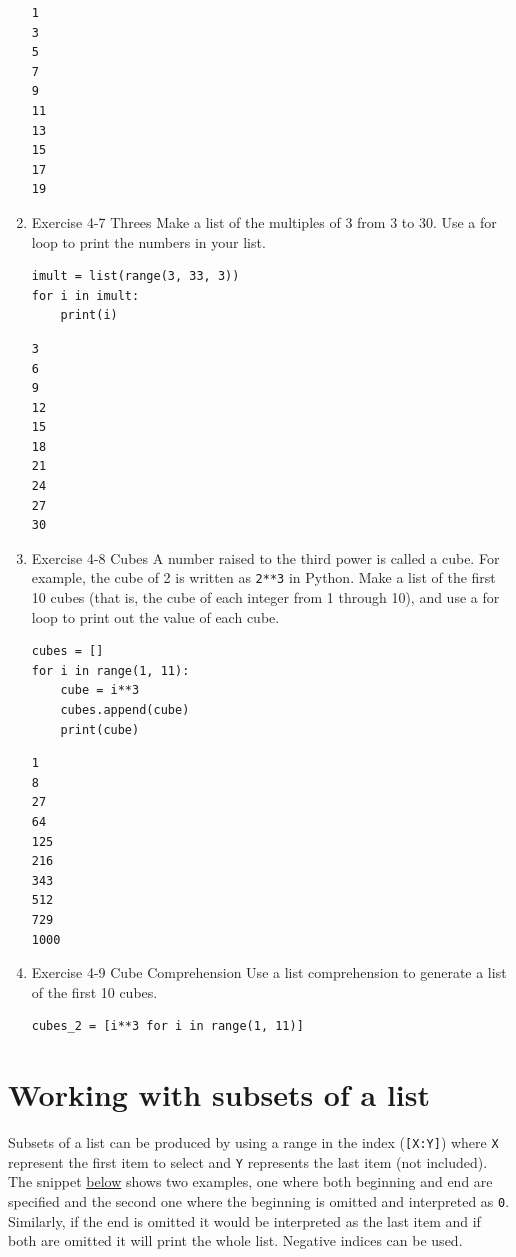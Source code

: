 \documentclass[10pt]{book}
\begin{document}
\begin{enumerate}
\label{org1cb2e98}
\begin{verbatim}
1
3
5
7
9
11
13
15
17
19
\end{verbatim}
\item Exercise 4-7 Threes
\label{sec:org32346a2}
Make a list of the multiples of 3 from 3 to 30. Use a for loop to print the numbers in your list.
\begin{verbatim}
imult = list(range(3, 33, 3))
for i in imult:
    print(i)
\end{verbatim}

\label{orge0b202f}
\begin{verbatim}
3
6
9
12
15
18
21
24
27
30
\end{verbatim}
\item Exercise 4-8 Cubes
\label{sec:org7b87284}
A number raised to the third power is called a cube. For example, the cube of 2 is written as \texttt{2**3} in Python. Make a list of the first 10 cubes (that is, the cube of each integer from 1 through 10), and use a for loop to print out the value of each cube.
\begin{verbatim}
cubes = []
for i in range(1, 11):
    cube = i**3
    cubes.append(cube)
    print(cube)
\end{verbatim}

\label{orgd5124e8}
\begin{verbatim}
1
8
27
64
125
216
343
512
729
1000
\end{verbatim}
\item Exercise 4-9 Cube Comprehension
\label{sec:org46ed1bd}
Use a list comprehension to generate a list of the first 10 cubes.
\begin{verbatim}
cubes_2 = [i**3 for i in range(1, 11)]
\end{verbatim}
\end{enumerate}
\section{Working with subsets of a list}
\label{sec:org360a37c}
Subsets of a list can be produced by using a range in the index (\texttt{[X:Y]}) where \texttt{X} represent the first item to select and \texttt{Y} represents the last item (not included). The snippet \hyperref[orgfcc1a8c]{below} shows two examples, one where both beginning and end are specified and the second one where the beginning is omitted and interpreted as \texttt{0}. Similarly, if the end is omitted it would be interpreted as the last item and if both are omitted it will print the whole list. Negative indices can be used.
\end{document}
